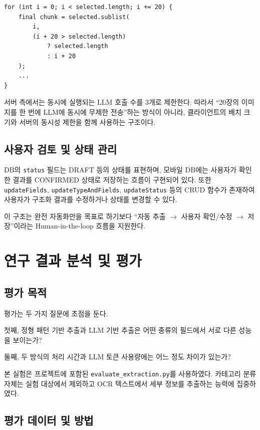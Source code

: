 \documentclass[11pt,a4paper]{article}
\begin{document}
\begin{lstlisting}
for (int i = 0; i < selected.length; i += 20) {
    final chunk = selected.sublist(
        i,
        (i + 20 > selected.length)
            ? selected.length
            : i + 20
    );
    ...
}
\end{lstlisting}

서버 측에서는 동시에 실행되는 LLM 호출 수를 3개로 제한한다. 따라서 ``20장의 이미지를 한 번에 LLM에 동시에 무제한 전송''하는 방식이 아니라, 클라이언트의 배치 크기와 서버의 동시성 제한을 함께 사용하는 구조이다.

\subsection{사용자 검토 및 상태 관리}

DB의 \texttt{status} 필드는 DRAFT 등의 상태를 표현하며, 모바일 DB에는 사용자가 확인한 결과를 CONFIRMED 상태로 저장하는 흐름이 구현되어 있다. 또한 \texttt{updateFields}, \texttt{updateTypeAndFields}, \texttt{updateStatus} 등의 CRUD 함수가 존재하여 사용자가 구조화 결과를 수정하거나 상태를 변경할 수 있다.

이 구조는 완전 자동화만을 목표로 하기보다 ``자동 추출 $\rightarrow$ 사용자 확인/수정 $\rightarrow$ 저장''이라는 Human-in-the-loop 흐름을 지원한다.

\newpage

\section{연구 결과 분석 및 평가}

\subsection{평가 목적}

평가는 두 가지 질문에 초점을 둔다.

첫째, 정형 패턴 기반 추출과 LLM 기반 추출은 어떤 종류의 필드에서 서로 다른 성능을 보이는가?

둘째, 두 방식의 처리 시간과 LLM 토큰 사용량에는 어느 정도 차이가 있는가?

본 실험은 프로젝트에 포함된 \texttt{evaluate\_extraction.py}를 사용하였다. 카테고리 분류 자체는 실험 대상에서 제외하고 OCR 텍스트에서 세부 정보를 추출하는 능력에 집중하였다.

\subsection{평가 데이터 및 방법}
\end{document}
